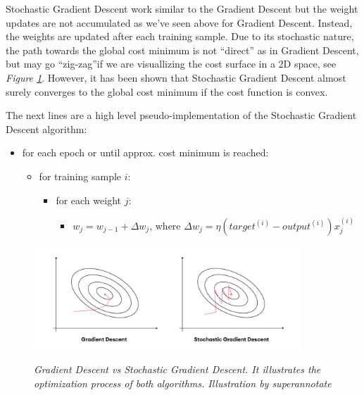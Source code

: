 Stochastic Gradient Descent work similar to the Gradient Descent but the weight updates are not accumulated as we’ve seen above for Gradient Descent. Instead, the weights are updated after each training sample. Due to its stochastic nature, the path towards the global cost minimum is not “direct” as in Gradient Descent, but may go “zig-zag”if we are visuallizing the cost surface in a 2D space, see \textit{Figure \ref{fig:sgdvsgd}}. However, it has been shown that Stochastic Gradient Descent almost surely converges to the global cost minimum if the cost function is convex. \\

\newpage

The next lines are a high level pseudo-implementation of the Stochastic Gradient Descent algorithm:

\begin{itemize}[label=$\circ$]
    \item for each epoch or until approx. cost minimum is reached:
        \begin{itemize}[label=$\circ$, topsep=0pt]
            \item for training sample \(i\):
              \begin{itemize}[label=$\circ$, topsep=5pt]
                \item for each weight \(j\):
                    \begin{itemize}[label=$\circ$, topsep=10pt]
                        \item \(w_j = w_{j-1} + \Delta w_j\), where \(\Delta w_j = \eta (target^{(i)} - output^{(i)})x_{j}^{(i)}\)
                    \end{itemize}
            \end{itemize}
        \end{itemize}
\end{itemize}

\begin{figure}[H]
\centering
\begin{adjustbox}{trim=0cm 0cm 0cm 1cm, clip}
\includegraphics[width=0.9\textwidth]{imatges/preliminaries/sgdvsgd.jpeg}
\end{adjustbox}
    \caption[Gradient Descent vs Stochastic Gradient Descent]{\textit{Gradient Descent vs Stochastic Gradient Descent. It illustrates the optimization process of both algorithms. Illustration by superannotate}}
{\label{fig:sgdvsgd}}
\end{figure}

